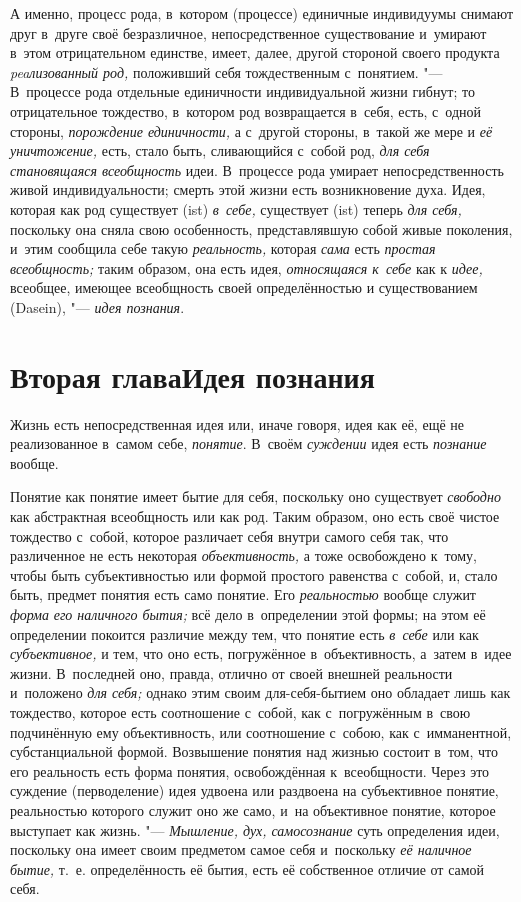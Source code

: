 А именно, процесс рода, в~котором (процессе) единичные
индивидуумы снимают друг в~друге своё безразличное, непосредственное
существование и~умирают в~этом отрицательном единстве, имеет, далее, другой
стороной своего продукта {\em peaлизованный род,}
положивший себя тождественным с~понятием. "--- В~процессе рода
отдельные единичности индивидуальной жизни гибнут; то
отрицательное тождество, в~котором род возвращается в~себя, есть, с~одной
стороны, {\em порождение единичности,}
а с~другой стороны, в~такой же мере и {\em её уничтожение,}
есть, стало быть, сливающийся с~собой род,
{\em для себя становящаяся всеобщность}
идеи. В~процессе рода умирает непосредственность живой
индивидуальности; смерть этой жизни есть возникновение духа. Идея, которая
как род существует (ist) {\em в~себе,}
существует (ist) теперь {\em для себя,} поскольку
она сняла свою особенность, представлявшую собой живые поколения, и~этим
сообщила себе такую {\em реальность,} которая {\em сама}
есть {\em простая всеобщность;} таким образом, она есть идея,
{\em относящаяся к~себе} как к {\em идее,}
всеобщее, имеющее всеобщность своей определённостью и
существованием (Dasein), "--- {\em идея познания}.

\chapter[Вторая глава Идея познания]{Вторая глава\newline Идея познания}

Жизнь есть непосредственная идея или, иначе говоря, идея как
её, ещё не реализованное в~самом себе, {\em понятие}. В~своём
{\em суждении} идея есть {\em познание} вообще.

Понятие как понятие имеет бытие для себя, поскольку оно
существует {\em свободно}
как абстрактная всеобщность или как род. Таким образом, оно
есть своё чистое тождество с~собой, которое различает себя внутри самого
себя так, что различенное не есть некоторая {\em объективность,} а
тоже освобождено к~тому, чтобы быть субъективностью или формой простого
равенства с~собой, и, стало быть, предмет понятия есть само понятие. Его
{\em реальностью} вообще служит {\em форма} {\em его наличного бытия;}
всё дело в~определении этой формы; на этом её определении
покоится различие между тем, что понятие есть
{\em в~себе} или как {\em субъективное,} и
тем, что оно есть, погружённое в~объективность, а~затем в~идее жизни.
В~последней оно, правда, отлично от своей внешней реальности и~положено
{\em для себя;} однако
этим своим для-себя-бытием оно обладает лишь как тождество, которое есть
соотношение с~собой, как с~погружённым в~свою подчинённую ему
объективность, или соотношение с~собою, как с~имманентной, субстанциальной
формой. Возвышение понятия над жизнью состоит в~том, что его реальность
есть форма понятия, освобождённая к~всеобщности. Через это суждение
(перводеление) идея удвоена или раздвоена на субъективное понятие,
реальностью которого служит оно же само, и~на объективное понятие, которое
выступает как жизнь. "--- {\em Мышление,
дух, самосознание} суть определения идеи, поскольку она
имеет своим предметом самое себя и~поскольку
{\em её наличное бытие,}
т.~е. определённость её бытия, есть её собственное отличие от
самой себя.


